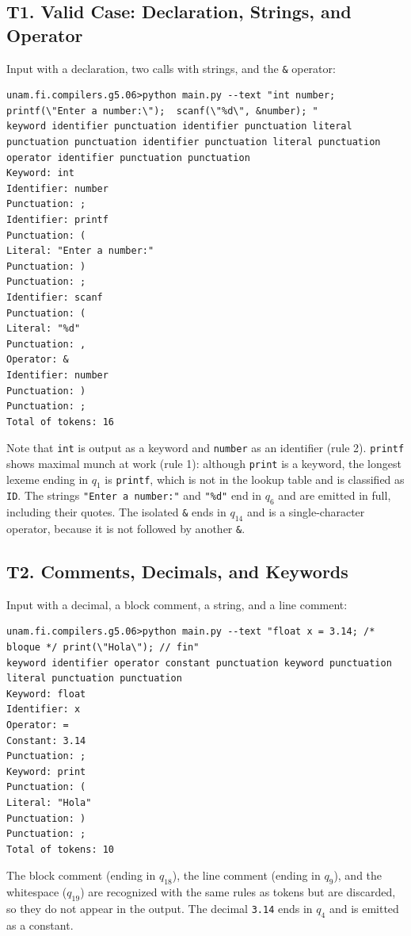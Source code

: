 \documentclass[12pt,letterpaper]{article}
\newcommand{\cd}[1]{\texttt{#1}}                       %
\begin{document}
\subsection{T1. Valid Case: Declaration, Strings, and Operator}

Input with a declaration, two calls with strings, and the \cd{\&} operator:

\begin{lstlisting}
unam.fi.compilers.g5.06>python main.py --text "int number; printf(\"Enter a number:\");  scanf(\"%d\", &number); "
keyword identifier punctuation identifier punctuation literal punctuation punctuation identifier punctuation literal punctuation operator identifier punctuation punctuation
Keyword: int
Identifier: number
Punctuation: ;
Identifier: printf
Punctuation: (
Literal: "Enter a number:"
Punctuation: )
Punctuation: ;
Identifier: scanf
Punctuation: (
Literal: "%d"
Punctuation: ,
Operator: &
Identifier: number
Punctuation: )
Punctuation: ;
Total of tokens: 16
\end{lstlisting}

Note that \cd{int} is output as a keyword and \cd{number} as an identifier (rule 2). \cd{printf} shows maximal munch at work (rule 1): although \cd{print} is a keyword, the longest lexeme ending in $q_1$ is \cd{printf}, which is not in the lookup table and is classified as \cd{ID}. The strings \cd{"Enter a number:"} and \cd{"\%d"} end in $q_6$ and are emitted in full, including their quotes. The isolated \cd{\&} ends in $q_{14}$ and is a single-character operator, because it is not followed by another \cd{\&}.

\subsection{T2. Comments, Decimals, and Keywords}

Input with a decimal, a block comment, a string, and a line comment:

\begin{lstlisting}
unam.fi.compilers.g5.06>python main.py --text "float x = 3.14; /* bloque */ print(\"Hola\"); // fin"
keyword identifier operator constant punctuation keyword punctuation literal punctuation punctuation
Keyword: float
Identifier: x
Operator: =
Constant: 3.14
Punctuation: ;
Keyword: print
Punctuation: (
Literal: "Hola"
Punctuation: )
Punctuation: ;
Total of tokens: 10
\end{lstlisting}

The block comment (ending in $q_{18}$), the line comment (ending in $q_9$), and the whitespace ($q_{19}$) are recognized with the same rules as tokens but are discarded, so they do not appear in the output. The decimal \cd{3.14} ends in $q_4$ and is emitted as a constant.
\end{document}
